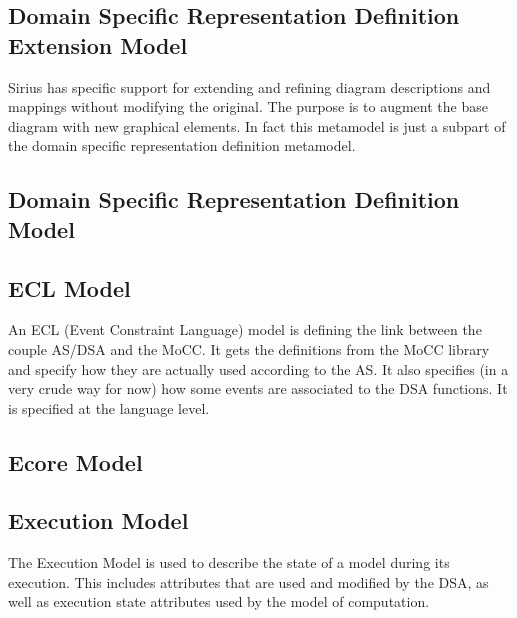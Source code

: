 \documentclass{gemoc} %
\begin{document}

\subsection{Domain Specific Representation Definition Extension Model}
\label{sec:Domain_Specific_Representation_Definition_Extension_Model}
Sirius has specific support for extending and refining diagram descriptions and mappings without modifying the original. The purpose is to augment the base diagram with new graphical elements. In fact this metamodel is just a subpart of the domain specific representation definition metamodel.

\subsection{Domain Specific Representation Definition Model}
\label{sec:Domain_Specific_Representation_Definition_Model}


\subsection{ECL Model}
\label{sec:ECL_Model}
An ECL (Event Constraint Language) model is defining the link between the couple AS/DSA and the MoCC.
\newline It gets the definitions from the MoCC library and specify how they are actually used according to the AS. It also specifies (in a very crude way for now) how some events are associated to the DSA functions.
\newline It is specified at the language level.

\subsection{Ecore Model}
\label{sec:Ecore_Model}


\subsection{Execution Model}
\label{sec:Execution_Model}
The Execution Model is used to describe the state of a model during its execution. This includes attributes that are used and modified by the DSA, as well as execution state attributes used by the model of computation.
\end{document}
